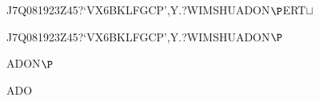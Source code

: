 \documentclass[12pt]{article}
\begin{document}
\begin{tt}
\begin{small}
\begin{bundle}{}
{\begin{bundle}{J7Q081923Z45?`VX6BKLFGCP',Y.?WIMSHUADON$\P$ERT$\sqcup$}
{\begin{bundle}{J7Q081923Z45?`VX6BKLFGCP',Y.?WIMSHUADON$\P$}
{\begin{bundle}{ADON$\P$}
{\begin{bundle}{ADO}
\end{bundle}}
\end{bundle}}
\end{bundle}}
\end{bundle}}
\end{bundle}
\end{small}
\end{tt}
\newpage%
\end{document}
